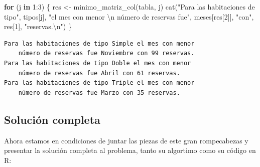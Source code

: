 \documentclass[
]{book}
\newenvironment{Shaded}{\begin{snugshade}}{\end{snugshade}}
\newcommand{\ControlFlowTok}[1]{\textcolor[rgb]{0.13,0.29,0.53}{\textbf{#1}}}
\newcommand{\DecValTok}[1]{\textcolor[rgb]{0.00,0.00,0.81}{#1}}
\newcommand{\FunctionTok}[1]{\textcolor[rgb]{0.00,0.00,0.00}{#1}}
\newcommand{\NormalTok}[1]{#1}
\newcommand{\OtherTok}[1]{\textcolor[rgb]{0.56,0.35,0.01}{#1}}
\newcommand{\SpecialCharTok}[1]{\textcolor[rgb]{0.00,0.00,0.00}{#1}}
\newcommand{\StringTok}[1]{\textcolor[rgb]{0.31,0.60,0.02}{#1}}
\begin{document}
\begin{Shaded}
\begin{Highlighting}[]
\ControlFlowTok{for}\NormalTok{ (j }\ControlFlowTok{in} \DecValTok{1}\SpecialCharTok{:}\DecValTok{3}\NormalTok{) \{}
\NormalTok{    res }\OtherTok{\textless{}{-}} \FunctionTok{minimo\_matriz\_col}\NormalTok{(tabla, j)}
    \FunctionTok{cat}\NormalTok{(}\StringTok{"Para las habitaciones de tipo"}\NormalTok{, tipos[j], }
        \StringTok{"el mes con menor }\SpecialCharTok{\textbackslash{}n}\StringTok{    número de reservas fue"}\NormalTok{, }
\NormalTok{        meses[res[}\DecValTok{2}\NormalTok{]], }\StringTok{"con"}\NormalTok{, res[}\DecValTok{1}\NormalTok{], }\StringTok{"reservas.}\SpecialCharTok{\textbackslash{}n}\StringTok{"}\NormalTok{)}
\NormalTok{\}}
\end{Highlighting}
\end{Shaded}

\begin{verbatim}
Para las habitaciones de tipo Simple el mes con menor 
    número de reservas fue Noviembre con 99 reservas.
Para las habitaciones de tipo Doble el mes con menor 
    número de reservas fue Abril con 61 reservas.
Para las habitaciones de tipo Triple el mes con menor 
    número de reservas fue Marzo con 35 reservas.
\end{verbatim}

\hypertarget{soluciuxf3n-completa}{%
\subsection{Solución completa}\label{soluciuxf3n-completa}}

Ahora estamos en condiciones de juntar las piezas de este gran rompecabezas y presentar la solución completa al problema, tanto su algortimo como su código en R:
\end{document}
